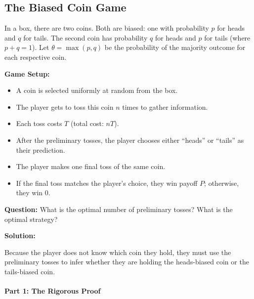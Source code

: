 
\subsection{The Biased Coin Game}

In a box, there are two coins.
Both are biased: one with probability $p$ for heads and $q$ for tails.
The second coin has probability $q$ for heads and $p$ for tails (where $p + q = 1$).
Let $\theta = \max(p, q)$ be the probability of the majority outcome for each respective coin.

\textbf{Game Setup:}
\begin{itemize}
    \item A coin is selected uniformly at random from the box.
    \item The player gets to toss this coin $n$ times to gather information.
    \item Each toss costs $T$ (total cost: $nT$).
    \item After the preliminary tosses, the player chooses either ``heads'' or ``tails'' as their prediction.
    \item The player makes one final toss of the same coin.
    \item If the final toss matches the player's choice, they win payoff $P$; otherwise, they win $0$.
\end{itemize}

\textbf{Question:} What is the optimal number of preliminary tosses? What is the optimal strategy?

\textbf{Solution:}

Because the player does not know which coin they hold, they must use the preliminary tosses to infer whether they are holding the heads-biased coin or the tails-biased coin.

\paragraph{Part 1: The Rigorous Proof}

